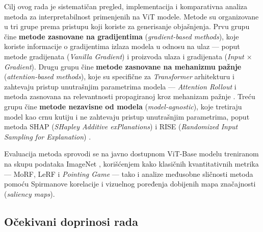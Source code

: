 Cilj ovog rada je sistematičan pregled, implementacija i komparativna analiza metoda za 
interpretabilnost primenjenih na ViT modele. Metode su organizovane u tri grupe prema 
pristupu koji koriste za generisanje objašnjenja. Prvu grupu čine \textbf{metode zasnovane 
na gradijentima} (\textit{gradient-based methods}), koje koriste informacije o gradijentima 
izlaza modela u odnosu na ulaz — poput metode gradijenata (\textit{Vanilla Gradient}) 
\cite{simonyan2014deep} i proizvoda ulaza i gradijenata (\textit{Input $\times$ Gradient}). 
Drugu grupu čine \textbf{metode zasnovane na mehanizmu pažnje} 
(\textit{attention-based methods}), koje su specifične za \textit{Transformer} arhitekturu 
i zahtevaju pristup unutrašnjim parametrima modela — \textit{Attention Rollout} 
\cite{abnar2020quantifying} i metoda zasnovana na relevantnosti propagiranoj kroz mehanizam 
pažnje \cite{chefer2021transformer}. Treću grupu čine \textbf{metode nezavisne od modela} 
(\textit{model-agnostic}), koje tretiraju model kao crnu kutiju i ne zahtevaju pristup 
unutrašnjim parametrima, poput metoda SHAP (\textit{SHapley Additive exPlanations}) \cite{lundberg2017shap} i RISE (\textit{Randomized Input Sampling for Explanation}) \cite{petsiuk2018rise}.

Evaluacija metoda sprovodi se na javno dostupnom ViT-Base modelu \cite{dosovitskiy2021vit} 
treniranom na skupu podataka ImageNet \cite{russakovsky2015imagenet}, korišćenjem kako 
klasičnih kvantitativnih metrika — MoRF, LeRF i \textit{Pointing Game} \cite{samek2017evaluating, 
zhang2018pointing} — tako i analize međusobne sličnosti metoda pomoću Spirmanove korelacije 
i vizuelnog poređenja dobijenih mapa značajnosti (\textit{saliency maps}).

\subsection{Očekivani doprinosi rada}


